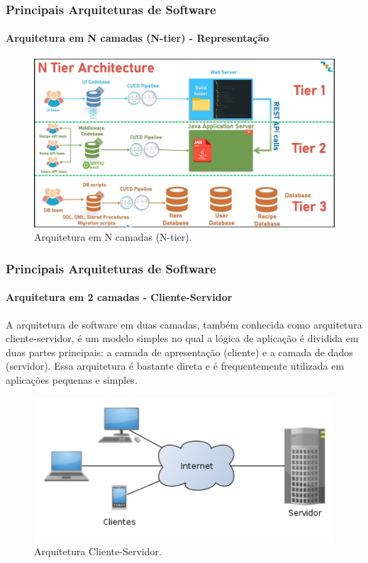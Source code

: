 \documentclass[
	10pt, %
	t, %
]{beamer}
\begin{document}
\begin{frame}
	\frametitle{Principais Arquiteturas de Software}
	\framesubtitle{Arquitetura em N camadas (N-tier) - Representação}
	
	\begin{figure}
		\centering
		\includegraphics[width=0.9\linewidth]{Images/n-tier.png}
		\caption{Arquitetura em N camadas (N-tier).}\label{fig:n-tier}
	\end{figure}

\end{frame}

\begin{frame}
	\frametitle{Principais Arquiteturas de Software}
	\framesubtitle{Arquitetura em 2 camadas - Cliente-Servidor}

	A arquitetura de software em duas camadas, também conhecida como arquitetura cliente-servidor, é um modelo simples no qual a lógica de aplicação é dividida em duas partes principais: a camada de apresentação (cliente) e a camada de dados (servidor). Essa arquitetura é bastante direta e é frequentemente utilizada em aplicações pequenas e simples.
	
	\begin{figure}
		\centering
		\includegraphics[width=0.7\linewidth]{Images/cliente-servidor.png}
		\caption{Arquitetura Cliente-Servidor.}\label{fig:cliente-servidor}
	\end{figure}

\end{frame}
\end{document}
